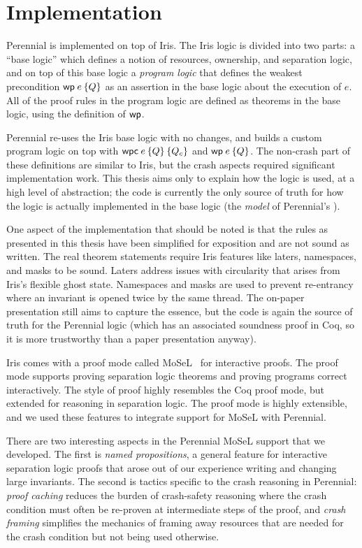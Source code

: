 \section{Implementation}
\label{sec:perennial:impl}

Perennial is implemented on top of Iris. The Iris logic is divided into two
parts: a ``base logic'' which defines a notion of resources, ownership, and
separation logic, and on top of this base logic a \emph{program logic} that
defines the weakest precondition $\wpre{e}{Q}$ as an assertion in the base logic
about the execution of $e$. All of the proof rules in the program logic are
defined as theorems in the base logic, using the definition of $\textsf{\upshape wp}$.

Perennial re-uses the Iris base logic with no changes, and builds a custom
program logic on top with $\wpc{e}{Q}{Q_{c}}$ and $\wpre{e}{Q}$. The non-crash
part of these definitions are similar to Iris, but the crash aspects required
significant implementation work. This thesis aims only to explain how the logic
is used, at a high level of abstraction; the code is currently the only
source of truth for how the logic is actually implemented in the base logic (the
\emph{model} of Perennial's \wpcw).

One aspect of the implementation that should be noted is that the rules as
presented in this thesis have been simplified for exposition and are not sound
as written. The real theorem statements require Iris features like laters,
namespaces, and masks to be sound. Laters address issues with circularity that
arises from Iris's flexible ghost state. Namespaces and masks are used to
prevent re-entrancy where an invariant is opened twice by the same thread. The
on-paper presentation still aims to capture the essence, but the code is again
the source of truth for the Perennial logic (which has an associated soundness
proof in Coq, so it is more trustworthy than a paper presentation anyway).

Iris comes with a proof mode called MoSeL~\cite{krebbers:ipm,krebbers:mosel} for
interactive proofs. The proof mode supports proving separation logic theorems
and proving programs correct interactively. The style of proof highly resembles
the Coq proof mode, but extended for reasoning in separation logic. The proof
mode is highly extensible, and we used these features to integrate support for
MoSeL with Perennial.

There are two interesting aspects in the Perennial MoSeL support that we
developed.
The first is \emph{named propositions}, a general feature for
interactive separation logic proofs that arose out of our experience writing and
changing large invariants. The second is tactics specific to the crash reasoning
in Perennial: \emph{proof caching} reduces the burden of crash-safety reasoning
where the crash condition must often be re-proven at intermediate steps of the
proof, and \emph{crash framing} simplifies the mechanics of framing away
resources that are needed for the crash condition but not being used otherwise.

